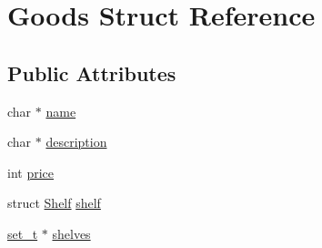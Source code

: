 \hypertarget{structGoods}{\section{Goods Struct Reference}
\label{structGoods}
}
\subsection*{Public Attributes}
\begin{DoxyCompactItemize}
\item 
char $\ast$ \hyperlink{structGoods_a10a587a1c8e7f70378704662c77cc543}{name}
\item 
char $\ast$ \hyperlink{structGoods_ae2a9c468b7d05199d18963be8c1d4ddc}{description}
\item 
int \hyperlink{structGoods_a37df40a762a8b91f5c35ca2126a3ebdd}{price}
\item 
struct \hyperlink{structShelf}{Shelf} \hyperlink{structGoods_aa81f3c106c29f524219d0696885a8e3c}{shelf}
\item 
\hyperlink{structset__t}{set\-\_\-t} $\ast$ \hyperlink{structGoods_a19afec90a964b7d29af488df58c03fae}{shelves}
\end{DoxyCompactItemize}


